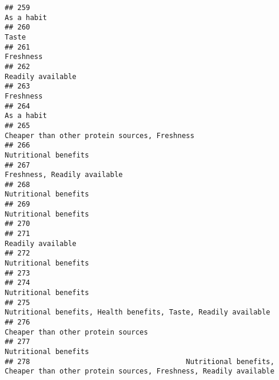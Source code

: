 \documentclass[
]{article}
\begin{document}
\begin{verbatim}
## 259                                                                                                                 As a habit
## 260                                                                                                                      Taste
## 261                                                                                                                  Freshness
## 262                                                                                                          Readily available
## 263                                                                                                                  Freshness
## 264                                                                                                                 As a habit
## 265                                                                              Cheaper than other protein sources, Freshness
## 266                                                                                                       Nutritional benefits
## 267                                                                                               Freshness, Readily available
## 268                                                                                                       Nutritional benefits
## 269                                                                                                       Nutritional benefits
## 270                                                                                                                           
## 271                                                                                                          Readily available
## 272                                                                                                       Nutritional benefits
## 273                                                                                                                           
## 274                                                                                                       Nutritional benefits
## 275                                                            Nutritional benefits, Health benefits, Taste, Readily available
## 276                                                                                         Cheaper than other protein sources
## 277                                                                                                       Nutritional benefits
## 278                                     Nutritional benefits, Cheaper than other protein sources, Freshness, Readily available

\end{verbatim}
\end{document}
